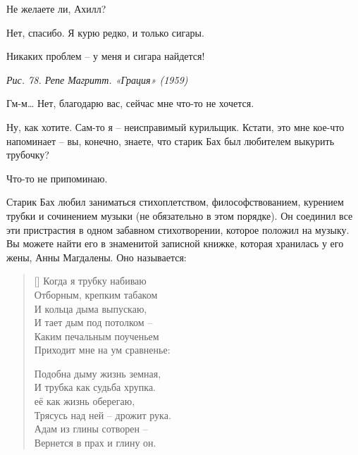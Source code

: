 \documentclass[../main.tex]{subfiles}
\begin{document}
\begin{dialogue}
 Не желаете ли, Ахилл?

 Нет, спасибо. Я курю редко, и только сигары.

 Никаких проблем \--- у меня и сигара найдется!


\emph{Рис. 78. Репе Магритт. «Грация» (1959)}

 Гм-м\ldots{} Нет, благодарю вас, сейчас мне что-то не хочется.

 Ну, как хотите. Сам-то я \--- неисправимый курильщик. Кстати, это мне кое-что напоминает \--- вы, конечно, знаете, что старик Бах был любителем выкурить трубочку?

 Что-то не припоминаю.

 Старик Бах любил заниматься стихоплетством, философствованием, курением трубки и сочинением музыки (не обязательно в этом порядке). Он соединил все эти пристрастия в одном забавном стихотворении, которое положил на музыку. Вы можете найти его в знаменитой записной книжке, которая хранилась у его жены, Анны Магдалены. Оно называется:

\begingroup
\renewcommand{\thefootnote}{\fnsymbol{footnote}}
\setlength{\beforePoemTitleskip}{\medskipamount}
\setlength{\afterPoemTitleskip}{\medskipamount}
\PlainPoemTitle
{}

\setlength{\stanzaskip}{2ex}
\settowidth{\versewidth}{В сравненьи с вечной мукой ада.}
\begin{verse}[\versewidth]
Когда я трубку набиваю \\
Отборным, крепким табаком \\
И кольца дыма выпускаю, \\
И тает дым под потолком \--- \\
Каким печальным поученьем \\
Приходит мне на ум сравненье:

Подобна дыму жизнь земная, \\
И трубка как судьба хрупка. \\
её как жизнь оберегаю, \\
Трясусь над ней \--- дрожит рука. \\
Адам из глины сотворен \--- \\
Вернется в прах и глину он.


\end{verse}
\end{dialogue}
\end{document}
